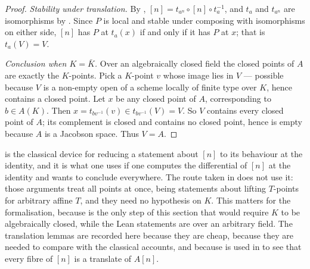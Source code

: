 \begin{proof}
\emph{Stability under translation.}  By
, $[n]=t_{a^n}\circ[n]\circ t_a^{-1}$, and
$t_a$ and $t_{a^n}$ are isomorphisms by .  Since $P$
is local and stable under composing with isomorphisms on either side, $[n]$ has
$P$ at $t_a(x)$ if and only if it has $P$ at $x$; that is $t_a(V)=V$.

\emph{Conclusion when $K=\bar K$.}  Over an algebraically closed field the
closed points of $A$ are exactly the $K$-points.  Pick a $K$-point $v$ whose
image lies in $V$ --- possible because $V$ is a non-empty open of a scheme
locally of finite type over $K$, hence contains a closed point.  Let $x$ be any
closed point of $A$, corresponding to $b\in A(K)$.  Then
$x=t_{bv^{-1}}(v)\in t_{bv^{-1}}(V)=V$.  So $V$ contains every closed point of
$A$; its complement is closed and contains no closed point, hence is empty
because $A$ is a Jacobson space.  Thus $V=A$.
\end{proof}

\begin{remark}\label{rem:av-translation-unused}
 is the classical device for reducing a
statement about $[n]$ to its behaviour at the identity, and it is what one uses
if one computes the differential of $[n]$ at the identity and wants to conclude
everywhere.  The route taken in
does not use it: those arguments treat all points at once, being statements
about lifting $T$-points for arbitrary affine $T$, and they need no hypothesis
on $K$.  This matters for the formalisation, because
 is the only step of this section that would
require $K$ to be algebraically closed, while the Lean statements are over an
arbitrary field.  The translation lemmas are recorded here because they are
cheap, because they are needed to compare with the classical accounts, and
because  is used in  to
see that every fibre of $[n]$ is a translate of $A[n]$.
\end{remark}


